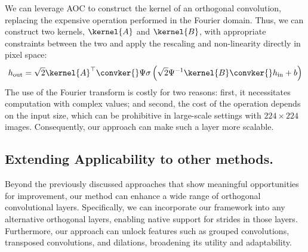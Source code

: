     We can leverage AOC to construct the kernel of an orthogonal convolution, replacing the expensive operation performed in the Fourier domain. Thus, we can construct two kernels, $\kernel{A}$ and $\kernel{B}$, with appropriate constraints between the two and apply the rescaling and non-linearity directly in pixel space:
    \[
    h_\text{out} = \sqrt{2} \kernel{A}^\top \convker{} \Psi \sigma \left( \sqrt{2} \Psi^{-1} \kernel{B} \convker{} h_\text{in} + b \right)
    \]
    The use of the Fourier transform is costly for two reasons: first, it necessitates computation with complex values; and second, the cost of the operation depends on the input size, which can be prohibitive in large-scale settings with $224 \times 224$ images. Consequently, our approach can make such a layer more scalable.


    \subsection{Extending Applicability to other methods.} Beyond the previously discussed approaches that show meaningful opportunities for improvement, our method can enhance a wide range of orthogonal convolutional layers. Specifically, we can incorporate our framework into any alternative orthogonal layers, enabling native support for strides in those layers. Furthermore, our approach can unlock features such as grouped convolutions, transposed convolutions, and dilations, broadening its utility and adaptability.

